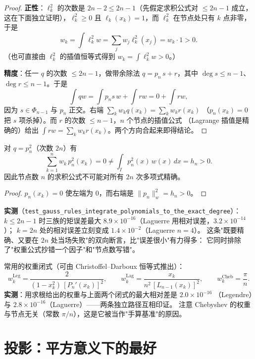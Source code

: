 \begin{proof}
\textbf{正性}：$\ell_k^2$ 的次数是 $2n-2\le2n-1$（先假定求积公式对 $\le 2n-1$ 成立，
这在下面独立证明），$\ell_k^2\ge0$ 且 $\ell_k(x_k)=1$，而 $\ell_k^2$ 在节点处只有
$k$ 点非零，于是
\[
  w_k=\int \ell_k^2 w=\sum_{j}w_j\ell_k^2(x_j)=w_k\cdot1>0 .
\]
（也可直接由 $\ell_k^2$ 的插值恒等式得到 $w_k=\int\ell_k^2w>0$。）

\textbf{精度}：任一 $q$ 的次数 $\le2n-1$，做带余除法 $q=p_n\,s+r$，其中
$\deg s\le n-1$、$\deg r\le n-1$。于是
\[
  \int q w=\int p_n s\,w+\int r w=0+\int r w,
\]
因为 $s\in\Phi_{n-1}$ 与 $p_n$ 正交。右端 $\sum_k w_kq(x_k)=\sum_k w_k r(x_k)$
（$p_n(x_k)=0$ 把 $s$ 项杀掉）。而 $r$ 的次数 $\le n-1$，$n$ 个节点的插值公式
（Lagrange 插值是精确的）给出 $\int r w=\sum_k w_k r(x_k)$。两个方向合起来即得结论。
\end{proof}

\begin{theorem}[$2n-1$ 是硬边界]
\label{thm:sharp}
对 $q=p_n^2$（次数 $2n$）有
\[
  \sum_{k=1}^n w_k\,p_n^2(x_k)=0\ne\int_I p_n^2(x)\,w(x)\,dx=h_n>0 .
\]
因此节点数 $n$ 的求积公式不可能对所有 $2n$ 次多项式精确。
\end{theorem}

\begin{proof}
$p_n(x_k)=0$ 使左端为 $0$，而右端是 $\|p_n\|_w^2=h_n>0$。
\end{proof}

\textbf{实测}（\texttt{test\_gauss\_rules\_integrate\_polynomials\_to\_the\_exact\_degree}）：
$k\le2n-1$ 时三族的矩误差最大 $8.9\times10^{-16}$（Laguerre 用相对误差，$3.2\times10^{-14}$）；
$k=2n$ 处的相对误差立刻变成 $1.4\times10^{-2}$（Laguerre $n=4$）。
这条"既要精确、又要在 $2n$ 处当场失败"的双向断言，比"误差很小"有力得多：
它同时排除了"权重公式抄错一个因子"和"节点数写错"。

常用的权重闭式（可由 Christoffel--Darboux 恒等式推出）：
\[
  w_k^{\text{Leg}}=\frac{2}{(1-x_k^2)\,[P_n'(x_k)]^2},\qquad
  w_k^{\text{Lag}}=\frac{x_k}{n^2\,[L_{n-1}(x_k)]^2},\qquad
  w_k^{\text{Cheb}}=\frac{\pi}{n}.
\]
\textbf{实测}：用求根给出的权重与上面两个闭式的最大相对差是 $2.0\times10^{-16}$
（Legendre）与 $2.8\times10^{-16}$（Laguerre）——两条独立路径互相印证。
注意 Chebyshev 的权重与节点无关（常数 $\pi/n$），这是它被当作"手算基准"的原因。

\section{投影：平方意义下的最好}

